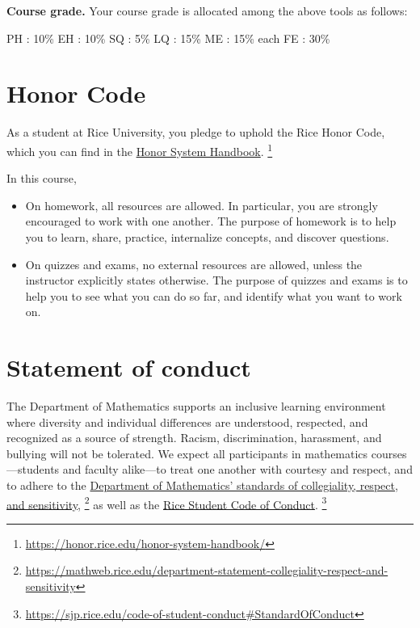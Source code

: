 \noindent{}\textbf{Course grade.}
Your course grade is allocated among the above tools as follows:
\begin{center}
{} \hfill{} PH : 10\% \hfill{} EH : 10\% \hfill{} SQ : 5\% \hfill{} LQ : 15\% \hfill{} ME : 15\% each \hfill{} FE : 30\% \hfill{} {}
\end{center}




%
%
%
%

\section{Honor Code}

As a student at Rice University, you pledge to uphold the Rice Honor Code, which you can find in the \href{https://honor.rice.edu/honor-system-handbook/}{Honor System Handbook}.%
\footnote{\href{https://honor.rice.edu/honor-system-handbook/}{https://honor.rice.edu/honor-system-handbook/}}%

In this course,
\begin{itemize}
	\item On homework, all resources are allowed. In particular, you are strongly encouraged to work with one another. The purpose of homework is to help you to learn, share, practice, internalize concepts, and discover questions.
	\item On quizzes and exams, no external resources are allowed, unless the instructor explicitly states otherwise. The purpose of quizzes and exams is to help you to see what you can do so far, and identify what you want to work on.
\end{itemize}




%
%
%
%

\section{Statement of conduct}

The Department of Mathematics supports an inclusive learning environment where diversity and individual differences are understood, respected, and recognized as a source of strength. Racism, discrimination, harassment, and bullying will not be tolerated. We expect all participants in mathematics courses---students and faculty alike---to treat one another with courtesy and respect, and to adhere to the \href{https://mathweb.rice.edu/department-statement-collegiality-respect-and-sensitivity}{Department of Mathematics' standards of collegiality, respect, and sensitivity},%
\footnote{\label{ftnt : Math Dept Statement}\href{https://mathweb.rice.edu/department-statement-collegiality-respect-and-sensitivity}{https://mathweb.rice.edu/department-statement-collegiality-respect-and-sensitivity}} %
as well as the \href{https://sjp.rice.edu/code-of-student-conduct#StandardOfConduct}{Rice Student Code of Conduct}.%
\footnote{\href{https://sjp.rice.edu/code-of-student-conduct\#StandardOfConduct}{https://sjp.rice.edu/code-of-student-conduct\#StandardOfConduct}}%

